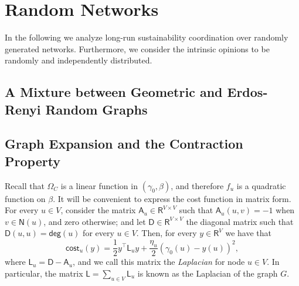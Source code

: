 \documentclass[letterpaper,11pt]{article}
\newcommand{\RR}{\mathsf{R}}
\newcommand{\EE}{\mathsf{E}}
\newcommand{\asf}{\mathsf{A}}
\newcommand{\dsf}{\mathsf{D}}
\newcommand{\lsf}{\mathsf{L}}
\newcommand{\nsf}{\mathsf{N}}
\newcommand{\cost}{\mathsf{cost}}
\newcommand{\degsf}{\mathsf{deg}}
\newtheorem{lemma}{Lemma}
\begin{document}
\section{Random Networks}

In the following we analyze long-run sustainability coordination over randomly generated networks.
Furthermore, we consider the intrinsic opinions to be randomly and independently distributed.
%
%
\subsection{A Mixture between Geometric and Erdos-Renyi Random Graphs}

\subsection{Graph Expansion and the Contraction Property}
Recall that $\Omega_C$ is a linear function in $(\gamma_0,\beta)$, and therefore $f_u$ is a quadratic function on $\beta$.
It will be convenient to express the cost function in matrix form.
For every $u\in V$, consider the matrix $\asf_u\in \RR^{V\times V}$ such that $\asf_u(u,v)=-1$ when $v\in \nsf(u)$, and zero otherwise; and let $\dsf\in \RR^{V\times V}$ the diagonal matrix such that $\dsf(u,u)=\degsf(u)$ for every $u\in V$.
Then, for every $y\in \RR^V$ we have that 
\begin{equation}
\cost_u(y)=\frac{1}{2}y^{\top}\lsf_u y+\frac{\eta_u}{2}(\gamma_0(u)-y(u))^2,
\end{equation}
where $\lsf_u=\dsf-\asf_u$, and we call this matrix the {\it Laplacian} for node $u\in V$.
In particular, the matrix $\lsf=\sum_{u\in V}\lsf_u$ is known as the Laplacian of the graph $G$.
\end{document}

